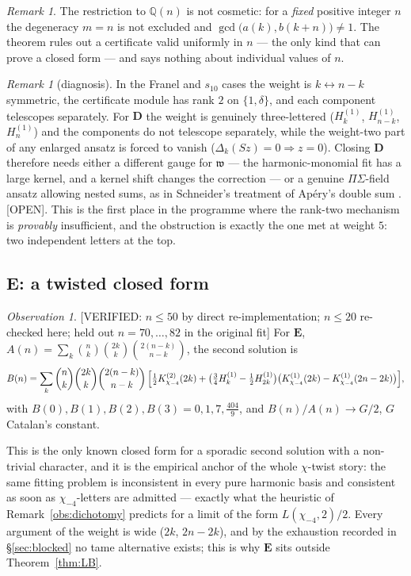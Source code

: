 \documentclass[11pt,reqno]{amsart}
\theoremstyle{plain}
\theoremstyle{definition}
\theoremstyle{remark}
\newtheorem{remark}[theorem]{Remark}
\newtheorem{observation}[theorem]{Observation}
\newcommand{\Q}{\mathbb{Q}}
\newcommand{\bin}[2]{\binom{#1}{#2}}
\newcommand{\HH}[2]{H^{(#1)}_{#2}}
\newcommand{\KK}[3]{K^{(#1)}_{#2}\!\left(#3\right)}
\newcommand{\VerifiedR}[1]{\textup{\textsf{[VERIFIED: #1]}}}
\newcommand{\Open}{\textup{\textsf{[OPEN]}}}
\numberwithin{equation}{section}
\begin{document}
\begin{remark}
The restriction to $\Q(n)$ is not cosmetic: for a \emph{fixed} positive integer $n$ the
degeneracy $m=n$ is not excluded and $\gcd\bigl(a(k),b(k+n)\bigr)\ne1$. The theorem rules
out a certificate valid uniformly in $n$ --- the only kind that can prove a closed form ---
and says nothing about individual values of $n$.
\end{remark}

\begin{remark}[diagnosis]
In the Franel and $s_{10}$ cases the weight is $k\leftrightarrow n-k$ symmetric, the
certificate module has rank $2$ on $\{1,\delta\}$, and each component telescopes
separately. For $\mathbf D$ the weight is genuinely three-lettered ($\HH1k$, $\HH1{n-k}$,
$\HH1n$) and the components do not telescope separately, while the weight-two part of any
enlarged ansatz is forced to vanish ($\Delta_k(Sz)=0\Rightarrow z=0$). Closing $\mathbf D$
therefore needs either a different gauge for $\mathfrak w$ --- the harmonic-monomial fit has
a large kernel, and a kernel shift changes the correction --- or a genuine $\Pi\Sigma$-field
ansatz allowing nested sums, as in Schneider's treatment of Ap\'ery's double sum
\cite{Schneider2007}. \Open. This is the first place in the programme where the rank-two
mechanism is \emph{provably} insufficient, and the obstruction is exactly the one met at
weight $5$: two independent letters at the top.
\end{remark}

\subsection{$\mathbf E$: a twisted closed form}\label{sec:E}
\begin{observation}\label{obs:Eform}
\VerifiedR{$n\le50$ by direct re-implementation; $n\le20$ re-checked here; held out
$n=70,\dots,82$ in the original fit}
For $\mathbf E$, $A(n)=\sum_k\bin nk\bin{2k}k\bin{2(n-k)}{n-k}$, the second solution is
\[
  B(n)=\sum_k\bin nk\bin{2k}k\bin{2(n-k)}{n-k}\,
       \Bigl[\tfrac12\KK2{\chi_{-4}}{2k}
       +\bigl(\tfrac34\HH1k-\tfrac12\HH1{2k}\bigr)
        \bigl(\KK1{\chi_{-4}}{2k}-\KK1{\chi_{-4}}{2n-2k}\bigr)\Bigr],
\]
with $B(0),B(1),B(2),B(3)=0,1,7,\tfrac{404}9$, and $B(n)/A(n)\to G/2$, $G$ Catalan's
constant.
\end{observation}

This is the only known closed form for a sporadic second solution with a non-trivial
character, and it is the empirical anchor of the whole $\chi$-twist story: the same fitting
problem is inconsistent in every pure harmonic basis and consistent as soon as
$\chi_{-4}$-letters are admitted --- exactly what the heuristic of
Remark~\ref{obs:dichotomy} predicts for a limit of the form $L(\chi_{-4},2)/2$. Every argument of the weight is wide
($2k$, $2n-2k$), and by the exhaustion recorded in \S\ref{sec:blocked} no tame alternative
exists; this is why $\mathbf E$ sits outside Theorem~\ref{thm:LB}.
\end{document}
